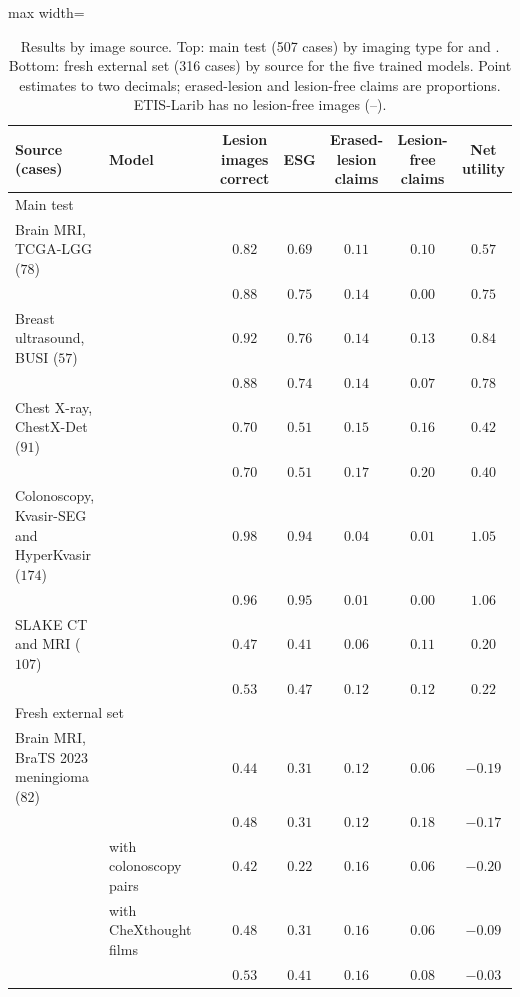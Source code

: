 \begin{table}[!htbp]
\caption{Results by image source. Top: main test (507 cases) by imaging type for \msn{} and \ms{}. Bottom: fresh external set (316 cases) by source for the five trained models. Point estimates to two decimals; erased-lesion and lesion-free claims are proportions. ETIS-Larib has no lesion-free images (--).}
\label{tab:s_source}
\centering
\footnotesize
\begin{adjustbox}{max width=\linewidth}
\begin{tabular}{ll c ccccc}
\toprule
Source (cases) & Model & & Lesion images correct & ESG & Erased-lesion claims & Lesion-free claims & Net utility \\
\midrule
\multicolumn{8}{l}{Main test} \\
Brain MRI, TCGA-LGG ($78$) & \msn{} & & $0.82$ & $0.69$ & $0.11$ & $0.10$ & $0.57$ \\
 & \ms{} & & $0.88$ & $0.75$ & $0.14$ & $0.00$ & $0.75$ \\
Breast ultrasound, BUSI ($57$) & \msn{} & & $0.92$ & $0.76$ & $0.14$ & $0.13$ & $0.84$ \\
 & \ms{} & & $0.88$ & $0.74$ & $0.14$ & $0.07$ & $0.78$ \\
Chest X-ray, ChestX-Det ($91$) & \msn{} & & $0.70$ & $0.51$ & $0.15$ & $0.16$ & $0.42$ \\
 & \ms{} & & $0.70$ & $0.51$ & $0.17$ & $0.20$ & $0.40$ \\
Colonoscopy, Kvasir-SEG and HyperKvasir ($174$) & \msn{} & & $0.98$ & $0.94$ & $0.04$ & $0.01$ & $1.05$ \\
 & \ms{} & & $0.96$ & $0.95$ & $0.01$ & $0.00$ & $1.06$ \\
SLAKE CT and MRI ($107$) & \msn{} & & $0.47$ & $0.41$ & $0.06$ & $0.11$ & $0.20$ \\
 & \ms{} & & $0.53$ & $0.47$ & $0.12$ & $0.12$ & $0.22$ \\
\midrule
\multicolumn{8}{l}{Fresh external set} \\
Brain MRI, BraTS 2023 meningioma ($82$) & \msn{} & & $0.44$ & $0.31$ & $0.12$ & $0.06$ & $-0.19$ \\
 & \msp{} & & $0.48$ & $0.31$ & $0.12$ & $0.18$ & $-0.17$ \\
 & \msp{} with colonoscopy pairs & & $0.42$ & $0.22$ & $0.16$ & $0.06$ & $-0.20$ \\
 & \msp{} with CheXthought films & & $0.48$ & $0.31$ & $0.16$ & $0.06$ & $-0.09$ \\
 & \ms{} & & $0.53$ & $0.41$ & $0.16$ & $0.08$ & $-0.03$ \\

\end{tabular}
\end{adjustbox}
\end{table}
